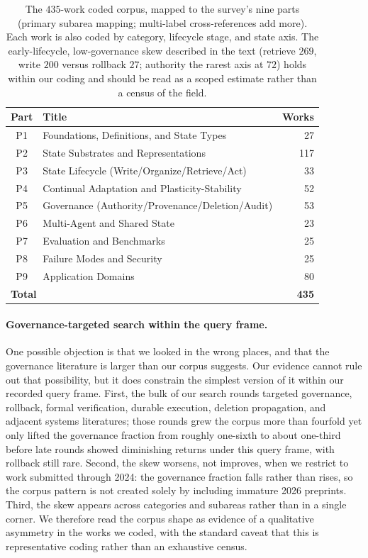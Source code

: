 \begin{table}[t]
\centering
\small
\begin{tabular}{clr}
\toprule
Part & Title & Works \\
\midrule
P1 & Foundations, Definitions, and State Types & 27 \\
P2 & State Substrates and Representations & 117 \\
P3 & State Lifecycle (Write/Organize/Retrieve/Act) & 33 \\
P4 & Continual Adaptation and Plasticity-Stability & 52 \\
P5 & Governance (Authority/Provenance/Deletion/Audit) & 53 \\
P6 & Multi-Agent and Shared State & 23 \\
P7 & Evaluation and Benchmarks & 25 \\
P8 & Failure Modes and Security & 25 \\
P9 & Application Domains & 80 \\
\midrule
\multicolumn{2}{l}{\textbf{Total}} & \textbf{435} \\
\bottomrule
\end{tabular}
\caption{The $435$-work coded corpus, mapped to the survey's nine parts (primary subarea mapping; multi-label cross-references add more). Each work is also coded by category, lifecycle stage, and state axis. The early-lifecycle, low-governance skew described in the text (retrieve $269$, write $200$ versus rollback $27$; authority the rarest axis at $72$) holds within our coding and should be read as a scoped estimate rather than a census of the field.}
\label{tab:intro-corpus}
\end{table}

\paragraph{Governance-targeted search within the query frame.} One possible objection is that we looked in the wrong places, and that the governance literature is larger than our corpus suggests. Our evidence cannot rule out that possibility, but it does constrain the simplest version of it within our recorded query frame. First, the bulk of our search rounds targeted governance, rollback, formal verification, durable execution, deletion propagation, and adjacent systems literatures; those rounds grew the corpus more than fourfold yet only lifted the governance fraction from roughly one-sixth to about one-third before late rounds showed diminishing returns under this query frame, with rollback still rare. Second, the skew worsens, not improves, when we restrict to work submitted through 2024: the governance fraction falls rather than rises, so the corpus pattern is not created solely by including immature 2026 preprints. Third, the skew appears across categories and subareas rather than in a single corner. We therefore read the corpus shape as evidence of a qualitative asymmetry in the works we coded, with the standard caveat that this is representative coding rather than an exhaustive census.

